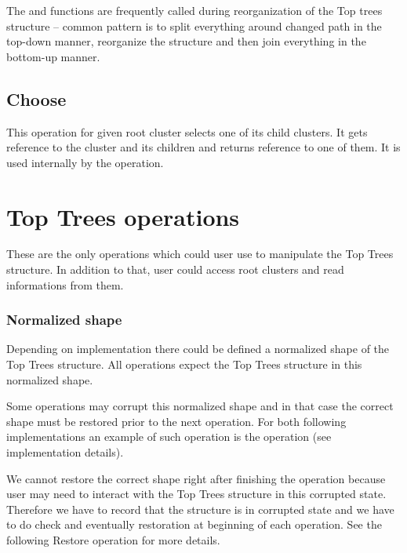 \bigskip

The \Join{} and \Split{} functions are frequently called during reorganization of the
Top trees structure -- common pattern is to split everything around changed path
in the top-down manner, reorganize the structure and then join everything in the
bottom-up manner.

\subsection{\sc Choose}


This operation for given root cluster selects one of its child clusters. It gets
reference to the cluster and its children and returns reference to one of them.
It is used internally by the \Search{} operation.


\section{Top Trees operations}

These are the only operations which could user use to manipulate the Top Trees
structure. In addition to that, user could access root clusters and read
informations from them.

\subsubsection{Normalized shape}

Depending on implementation there could be defined a normalized shape of the
Top Trees structure. All operations expect the Top Trees structure in this
normalized shape.

Some operations may corrupt this normalized shape and in that case the correct
shape must be restored prior to the next operation. For both following
implementations an example of such operation is the \Expose{} operation (see
implementation details).

We cannot restore the correct shape right after finishing the operation because
user may need to interact with the Top Trees structure in this corrupted state.
Therefore we have to record that the structure is in corrupted state and we have
to do check and eventually restoration at beginning of each operation. See the
following {\I Restore} operation for more details.


